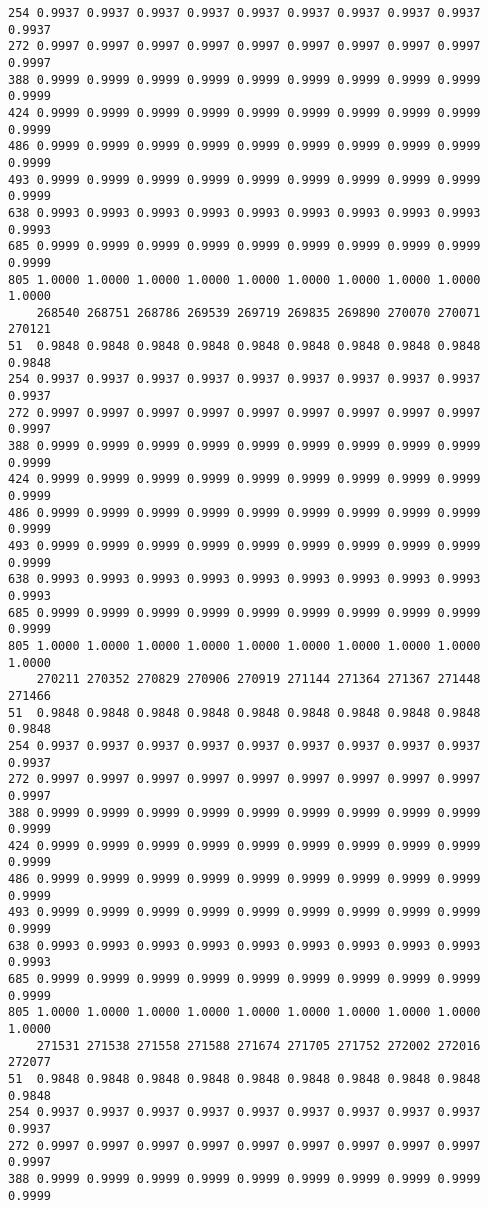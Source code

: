 \documentclass[
]{report}
\begin{document}
\begin{verbatim}
254 0.9937 0.9937 0.9937 0.9937 0.9937 0.9937 0.9937 0.9937 0.9937 0.9937
272 0.9997 0.9997 0.9997 0.9997 0.9997 0.9997 0.9997 0.9997 0.9997 0.9997
388 0.9999 0.9999 0.9999 0.9999 0.9999 0.9999 0.9999 0.9999 0.9999 0.9999
424 0.9999 0.9999 0.9999 0.9999 0.9999 0.9999 0.9999 0.9999 0.9999 0.9999
486 0.9999 0.9999 0.9999 0.9999 0.9999 0.9999 0.9999 0.9999 0.9999 0.9999
493 0.9999 0.9999 0.9999 0.9999 0.9999 0.9999 0.9999 0.9999 0.9999 0.9999
638 0.9993 0.9993 0.9993 0.9993 0.9993 0.9993 0.9993 0.9993 0.9993 0.9993
685 0.9999 0.9999 0.9999 0.9999 0.9999 0.9999 0.9999 0.9999 0.9999 0.9999
805 1.0000 1.0000 1.0000 1.0000 1.0000 1.0000 1.0000 1.0000 1.0000 1.0000
    268540 268751 268786 269539 269719 269835 269890 270070 270071 270121
51  0.9848 0.9848 0.9848 0.9848 0.9848 0.9848 0.9848 0.9848 0.9848 0.9848
254 0.9937 0.9937 0.9937 0.9937 0.9937 0.9937 0.9937 0.9937 0.9937 0.9937
272 0.9997 0.9997 0.9997 0.9997 0.9997 0.9997 0.9997 0.9997 0.9997 0.9997
388 0.9999 0.9999 0.9999 0.9999 0.9999 0.9999 0.9999 0.9999 0.9999 0.9999
424 0.9999 0.9999 0.9999 0.9999 0.9999 0.9999 0.9999 0.9999 0.9999 0.9999
486 0.9999 0.9999 0.9999 0.9999 0.9999 0.9999 0.9999 0.9999 0.9999 0.9999
493 0.9999 0.9999 0.9999 0.9999 0.9999 0.9999 0.9999 0.9999 0.9999 0.9999
638 0.9993 0.9993 0.9993 0.9993 0.9993 0.9993 0.9993 0.9993 0.9993 0.9993
685 0.9999 0.9999 0.9999 0.9999 0.9999 0.9999 0.9999 0.9999 0.9999 0.9999
805 1.0000 1.0000 1.0000 1.0000 1.0000 1.0000 1.0000 1.0000 1.0000 1.0000
    270211 270352 270829 270906 270919 271144 271364 271367 271448 271466
51  0.9848 0.9848 0.9848 0.9848 0.9848 0.9848 0.9848 0.9848 0.9848 0.9848
254 0.9937 0.9937 0.9937 0.9937 0.9937 0.9937 0.9937 0.9937 0.9937 0.9937
272 0.9997 0.9997 0.9997 0.9997 0.9997 0.9997 0.9997 0.9997 0.9997 0.9997
388 0.9999 0.9999 0.9999 0.9999 0.9999 0.9999 0.9999 0.9999 0.9999 0.9999
424 0.9999 0.9999 0.9999 0.9999 0.9999 0.9999 0.9999 0.9999 0.9999 0.9999
486 0.9999 0.9999 0.9999 0.9999 0.9999 0.9999 0.9999 0.9999 0.9999 0.9999
493 0.9999 0.9999 0.9999 0.9999 0.9999 0.9999 0.9999 0.9999 0.9999 0.9999
638 0.9993 0.9993 0.9993 0.9993 0.9993 0.9993 0.9993 0.9993 0.9993 0.9993
685 0.9999 0.9999 0.9999 0.9999 0.9999 0.9999 0.9999 0.9999 0.9999 0.9999
805 1.0000 1.0000 1.0000 1.0000 1.0000 1.0000 1.0000 1.0000 1.0000 1.0000
    271531 271538 271558 271588 271674 271705 271752 272002 272016 272077
51  0.9848 0.9848 0.9848 0.9848 0.9848 0.9848 0.9848 0.9848 0.9848 0.9848
254 0.9937 0.9937 0.9937 0.9937 0.9937 0.9937 0.9937 0.9937 0.9937 0.9937
272 0.9997 0.9997 0.9997 0.9997 0.9997 0.9997 0.9997 0.9997 0.9997 0.9997
388 0.9999 0.9999 0.9999 0.9999 0.9999 0.9999 0.9999 0.9999 0.9999 0.9999

\end{verbatim}
\end{document}
